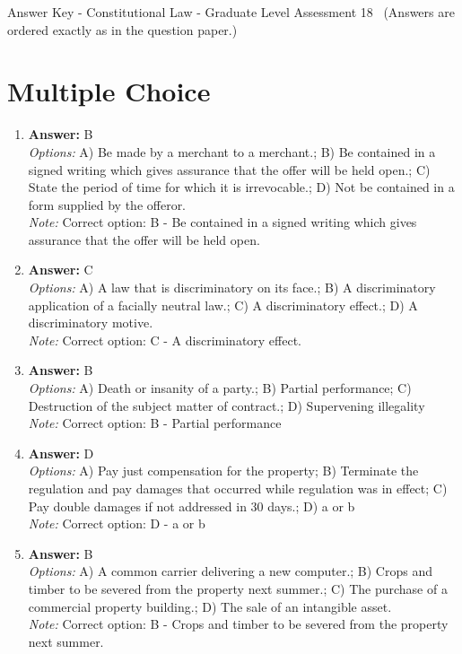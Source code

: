 \documentclass[12pt]{article}
\begin{document}
\begin{center}
Answer Key - Constitutional Law - Graduate Level Assessment 18 \
\small (Answers are ordered exactly as in the question paper.)
\end{center}

\section*{Multiple Choice}
\begin{enumerate}[label=\arabic*.]
\item \textbf{Answer:} B
\\ \textit{Options:} A) Be made by a merchant to a merchant.; B) Be contained in a signed writing which gives assurance that the offer will be held open.; C) State the period of time for which it is irrevocable.; D) Not be contained in a form supplied by the offeror.
\\ \textit{Note:} Correct option: B - Be contained in a signed writing which gives assurance that the offer will be held open.
\item \textbf{Answer:} C
\\ \textit{Options:} A) A law that is discriminatory on its face.; B) A discriminatory application of a facially neutral law.; C) A discriminatory effect.; D) A discriminatory motive.
\\ \textit{Note:} Correct option: C - A discriminatory effect.
\item \textbf{Answer:} B
\\ \textit{Options:} A) Death or insanity of a party.; B) Partial performance; C) Destruction of the subject matter of contract.; D) Supervening illegality
\\ \textit{Note:} Correct option: B - Partial performance
\item \textbf{Answer:} D
\\ \textit{Options:} A) Pay just compensation for the property; B) Terminate the regulation and pay damages that occurred while regulation was in effect; C) Pay double damages if not addressed in 30 days.; D) a or b
\\ \textit{Note:} Correct option: D - a or b
\item \textbf{Answer:} B
\\ \textit{Options:} A) A common carrier delivering a new computer.; B) Crops and timber to be severed from the property next summer.; C) The purchase of a commercial property building.; D) The sale of an intangible asset.
\\ \textit{Note:} Correct option: B - Crops and timber to be severed from the property next summer.
\end{enumerate}
\end{document}
